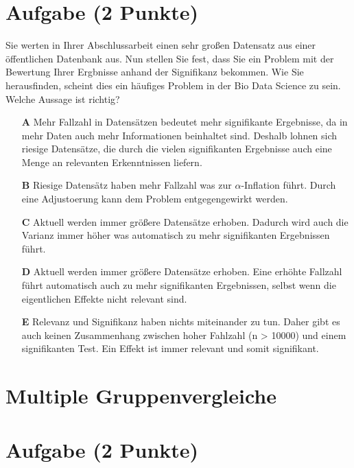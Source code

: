 \documentclass[a4paper, 9pt]{scrartcl}\usepackage[]{graphicx}\usepackage[]{xcolor}
\begin{document}
\section{Aufgabe \hfill (2 Punkte)}



Sie werten in Ihrer Abschlussarbeit einen sehr großen Datensatz aus einer öffentlichen Datenbank aus. Nun stellen Sie fest, dass Sie ein Problem mit der Bewertung Ihrer Ergbnisse anhand der Signifikanz bekommen. Wie Sie herausfinden, scheint dies ein häufiges Problem in der Bio Data Science zu sein. Welche Aussage ist richtig?




\begin{enumerate}
\item [\textbf{A} \msquare] Mehr Fallzahl in Datensätzen bedeutet mehr signifikante Ergebnisse, da in mehr Daten auch mehr Informationen beinhaltet sind. Deshalb lohnen sich riesige Datensätze, die durch die vielen signifikanten Ergebnisse auch eine Menge an relevanten Erkenntnissen liefern.
\item [\textbf{B} \msquare] Riesige Datensätz haben mehr Fallzahl was zur $\alpha$-Inflation führt. Durch eine Adjustoerung kann dem Problem entgegengewirkt werden.
\item [\textbf{C} \msquare] Aktuell werden immer größere Datensätze erhoben. Dadurch wird auch die Varianz immer höher was automatisch zu mehr signifikanten Ergebnissen führt.
\item [\textbf{D} \msquare] Aktuell werden immer größere Datensätze erhoben. Eine erhöhte Fallzahl führt automatisch auch zu mehr signifikanten Ergebnissen, selbst wenn die eigentlichen Effekte nicht relevant sind.
\item [\textbf{E} \msquare] Relevanz und Signifikanz haben nichts miteinander zu tun. Daher gibt es auch keinen Zusammenhang zwischen hoher Fahlzahl (n > 10000) und einem signifikanten Test. Ein Effekt ist immer relevant und somit signifikant.
\end{enumerate}
\section*{Multiple Gruppenvergleiche}    

\section{Aufgabe \hfill (2 Punkte)}
\end{document}
